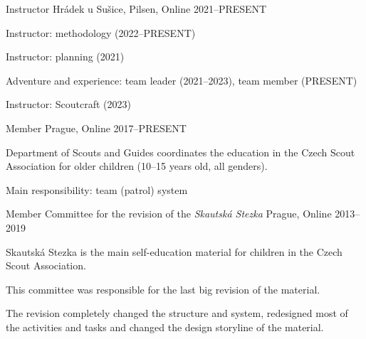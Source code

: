 


\begin{cventries}

  \cventry
    {Instructor} %
    {} %
    {Hrádek u Sušice, Pilsen, Online} %
    {2021--PRESENT} %
    {
      \begin{cvitems} %
        \item {Instructor: methodology  (2022--PRESENT)}
        \item {Instructor: planning (2021)}
        \item {Adventure and experience: team leader (2021--2023), team member (PRESENT)}
        \item {Instructor: Scoutcraft (2023)}
      \end{cvitems}
    }

    \cventry
      {Member} %
      {} %
      {Prague, Online} %
      {2017--PRESENT} %
      {
        \begin{cvitems} %
          \item {Department of Scouts and Guides coordinates the education in the Czech Scout Association for older children (10--15 years old, all genders).} 
          \item {Main responsibility: team (patrol) system}
        \end{cvitems}
      }

  \cventry
    {Member} %
    {Committee for the revision of the \emph{Skautská Stezka}} %
    {Prague, Online} %
    {2013--2019} %
    {
      \begin{cvitems} %
        \item {Skautská Stezka is the main self-education material for children in the Czech Scout Association.} 
        \item {This committee was responsible for the last big revision of the material.}
        \item {The revision completely changed the structure and system, redesigned most of the activities and tasks and changed the design storyline of the material.}
      \end{cvitems}
    }


\end{cventries}
